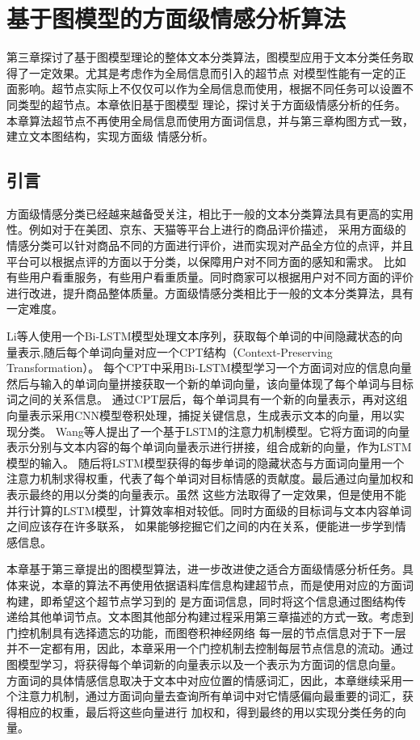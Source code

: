 \chapter{基于图模型的方面级情感分析算法}
第三章探讨了基于图模型理论的整体文本分类算法，图模型应用于文本分类任务取得了一定效果。尤其是考虑作为全局信息而引入的超节点
对模型性能有一定的正面影响。超节点实际上不仅仅可以作为全局信息而使用，根据不同任务可以设置不同类型的超节点。本章依旧基于图模型
理论，探讨关于方面级情感分析的任务。本章算法超节点不再使用全局信息而使用方面词信息，并与第三章构图方式一致，建立文本图结构，实现方面级
情感分析。

\section{引言}
方面级情感分类已经越来越备受关注，相比于一般的文本分类算法具有更高的实用性。例如对于在美团、京东、天猫等平台上进行的商品评价描述，
采用方面级的情感分类可以针对商品不同的方面进行评价，进而实现对产品全方位的点评，并且平台可以根据点评的方面以于分类，以保障用户对不同方面的感知和需求。
比如有些用户看重服务，有些用户看重质量。同时商家可以根据用户对不同方面的评价进行改进，提升商品整体质量。方面级情感分类相比于一般的文本分类算法，具有一定难度。

Li等人使用一个Bi-LSTM模型处理文本序列，获取每个单词的中间隐藏状态的向量表示,随后每个单词向量对应一个CPT结构（Context-Preserving Transformation）。
每个CPT中采用Bi-LSTM模型学习一个方面词对应的信息向量然后与输入的单词向量拼接获取一个新的单词向量，该向量体现了每个单词与目标词之间的关系信息。
通过CPT层后，每个单词具有一个新的向量表示，再对这组向量表示采用CNN模型卷积处理，捕捉关键信息，生成表示文本的向量，用以实现分类。
Wang等人提出了一个基于LSTM的注意力机制模型。它将方面词的向量表示分别与文本内容的每个单词向量表示进行拼接，组合成新的向量，作为LSTM模型的输入。
随后将LSTM模型获得的每步单词的隐藏状态与方面词向量用一个注意力机制求得权重，代表了每个单词对目标情感的贡献度。最后通过向量加权和表示最终的用以分类的向量表示。虽然
这些方法取得了一定效果，但是使用不能并行计算的LSTM模型，计算效率相对较低。同时方面级的目标词与文本内容单词之间应该存在许多联系，
如果能够挖掘它们之间的内在关系，便能进一步学到情感信息。

本章基于第三章提出的图模型算法，进一步改进使之适合方面级情感分析任务。具体来说，本章的算法不再使用依据语料库信息构建超节点，而是使用对应的方面词构建，即希望这个超节点学习到的
是方面词信息，同时将这个信息通过图结构传递给其他单词节点。文本图其他部分构建过程采用第三章描述的方式一致。考虑到门控机制具有选择遗忘的功能，而图卷积神经网络
每一层的节点信息对于下一层并不一定都有用，因此，本章采用一个门控机制去控制每层节点信息的流动。通过图模型学习，将获得每个单词新的向量表示以及一个表示为方面词的信息向量。
方面词的具体情感信息取决于文本中对应位置的情感词汇，因此，本章继续采用一个注意力机制，通过方面词向量去查询所有单词中对它情感偏向最重要的词汇，获得相应的权重，最后将这些向量进行
加权和，得到最终的用以实现分类任务的向量。

